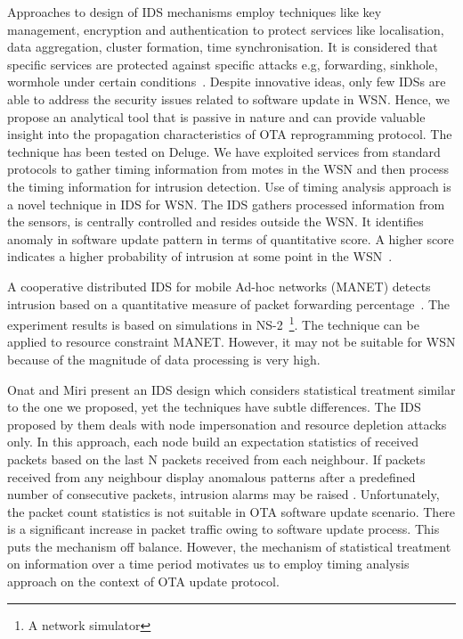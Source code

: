 \documentclass[conference,final]{IEEEtran}
\begin{document}
Approaches to design of IDS mechanisms %
employ techniques like key management, encryption and authentication to protect services like localisation, data aggregation, cluster formation, time synchronisation.
It is considered that specific services are protected against specific attacks e.g, forwarding, sinkhole, wormhole under certain conditions~\cite{1639675, 6096939, sink08, 5172466}.
Despite innovative ideas, only few IDSs are able to address the security issues related to software update in WSN.
Hence, we propose an analytical tool that is passive in nature and can provide valuable insight into the propagation characteristics of OTA reprogramming protocol. 
The technique has been tested on Deluge.
We have exploited services from standard protocols to gather timing information from motes in  the WSN and then process the timing information for intrusion detection.
Use of timing analysis approach is a novel technique in IDS for WSN.
The IDS  gathers processed information from the sensors, is centrally controlled and resides outside the WSN.
It  identifies anomaly in software update pattern in terms of quantitative score. 
A higher score indicates a higher probability of intrusion at some point in the WSN~\cite{aalam14}. 


A cooperative distributed IDS for mobile Ad-hoc networks (MANET) detects intrusion based on a quantitative measure of packet forwarding percentage~\cite{hua03}.
The experiment results is based on simulations in NS-2~\footnote{A network simulator}.
The technique can be applied to resource constraint MANET.
However, it may not be suitable for WSN because of the magnitude of data processing is very high. 


Onat and Miri present an IDS design which considers statistical treatment similar to the one we proposed, yet the techniques have subtle differences.
The IDS proposed by them deals with node impersonation and resource depletion attacks only.
In this approach, each node build an expectation statistics of received packets based on the last N packets received from each neighbour.
If packets received from any neighbour display anomalous patterns after a predefined number of consecutive packets, intrusion alarms may be raised \cite{1512911}.
Unfortunately, the  packet count statistics is not suitable in OTA software update scenario.
There is a significant increase in packet traffic owing to software update process. 
This puts the mechanism off balance.
However, the mechanism of statistical treatment on information over a time period motivates us to employ timing analysis approach on the context of OTA update protocol.
\end{document}
